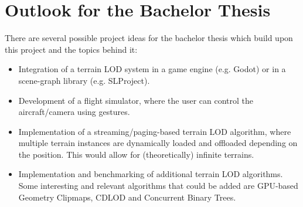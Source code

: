 \section{Outlook for the Bachelor Thesis}
There are several possible project ideas for the bachelor thesis which build upon this project and the topics behind it:
\begin{itemize}
      \item Integration of a terrain LOD system in a game engine (e.g. Godot) or in a scene-graph library (e.g. SLProject).
      \item Development of a flight simulator, where the user can control the aircraft/camera using gestures.
      \item Implementation of a streaming/paging-based terrain LOD algorithm, where multiple terrain instances are dynamically loaded and offloaded depending on the position.
            This would allow for (theoretically) infinite terrains. 
      \item Implementation and benchmarking of additional terrain LOD algorithms. Some interesting and relevant algorithms that could be added 
      are GPU-based Geometry Clipmaps, CDLOD and Concurrent Binary Trees.
\end{itemize}